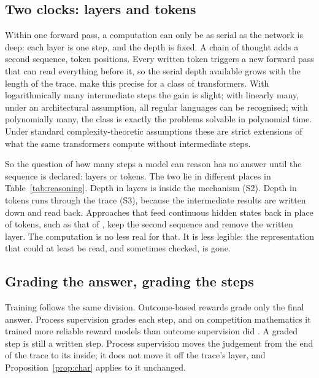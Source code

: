 \subsection{Two clocks: layers and tokens}

Within one forward pass, a computation can only be as serial as the network is deep: each
layer is one step, and the depth is fixed. A chain of thought adds a second sequence,
token positions. Every written token triggers a new forward pass that can read
everything before it, so the serial depth available grows with the length of the trace.
\citet{merrill2024} make this precise for a class of transformers. With logarithmically
many intermediate steps the gain is slight; with linearly many, under an architectural
assumption, all regular languages can be recognised; with polynomially many, the class
is exactly the problems solvable in polynomial time. Under standard
complexity-theoretic assumptions these are strict extensions of what the same
transformers compute without intermediate steps.

So the question of how many steps a model can reason has no answer until the sequence is
declared: layers or tokens. The two lie in different places in
Table~\ref{tab:reasoning}. Depth in layers is inside the mechanism (S2). Depth in tokens
runs through the trace (S3), because the intermediate results are written down and read
back. Approaches that feed continuous hidden states back in place of tokens, such as
that of \citet{hao2024}, keep the second sequence and remove the written layer. The
computation is no less real for that. It is less legible: the representation that could
at least be read, and sometimes checked, is gone.

\subsection{Grading the answer, grading the steps}

Training follows the same division. Outcome-based rewards grade only the final answer.
Process supervision grades each step, and on competition mathematics it trained more
reliable reward models than outcome supervision did \citep{lightman2023}. A graded step
is still a written step. Process supervision moves the judgement from the end of the
trace to its inside; it does not move it off the trace's layer, and
Proposition~\ref{prop:char} applies to it unchanged.

